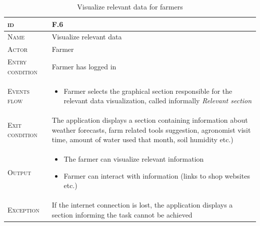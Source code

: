 \begin{table}[H]
    \centering
    \begin{tabular}{|l|p{}|}
        \hline %
    	\textsc{id}                 &   F.6\\
    	\hline %
    	\textsc{Name}               &   Visualize relevant data\\
    	\hline %
    	\textsc{Actor}             &   Farmer\\
    	\hline %
    	\textsc{Entry condition}   &   Farmer has logged in\\
    	\hline %
    	\textsc{Events flow}         &   %
            	                        \begin{itemize}
                                    	    \item Farmer selects the graphical section responsible for the relevant data visualization, called informally \textit{Relevant section}
                                        \end{itemize}\\
        \hline %
        \textsc{Exit condition}    &  The application displays a section containing information about weather forecasts, farm related tools suggestion, agronomist visit time, amount of water used that month, soil humidity etc.)\\
    	\hline %
    	\textsc{Output}             &  \begin{itemize}
    	    \item The farmer can visualize relevant information
    	    \item Farmer can interact with information (links to shop websites etc.)
    	\end{itemize}\\
    	\hline %
    	\textsc{Exception}         &   If the internet connection is lost, the application displays a section informing the task cannot be achieved\\
    	\hline %
        
    \end{tabular}

\caption{\label{tab:visualize_relevant_data}Visualize relevant data for farmers}
\end{table}
